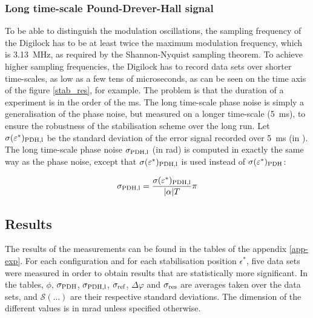 
\subsubsection{Long time-scale Pound-Drever-Hall signal}

To be able to distinguish the modulation oscillations, the sampling frequency of the Digilock has to be at least twice the maximum \pdh modulation frequency, which is \SI{3.13}{\mega\hertz}, as required by the Shannon-Nyquist sampling theorem. To achieve higher sampling frequencies, the Digilock has to record data sets over shorter time-scales, as low as a few tens of microseconds, as can be seen on the time axis of the figure \ref{stab_res}, for example. The problem is that the duration of a \rcer experiment is in the order of the \si{\milli\second}. The long time-scale \pdh phase noise is simply a generalisation of the \pdh phase noise, but measured on a longer time-scale (\SI{5}{\milli\second}), to ensure the robustness of the stabilisation scheme over the long run. Let $\sigma(\varepsilon^*)_{\text{PDH,l}}$ be the standard deviation of the \pdh error signal recorded over \SI{5}{\milli\second} (in \si{\au}). The long time-scale \pdh phase noise $\sigma_{\text{PDH,l}}$ (in \si{\radian}) is computed in exactly the same way as the \pdh phase noise, except that $\sigma(\varepsilon^*)_{\text{PDH,l}}$ is used instead of $\sigma(\varepsilon^*)_{\text{PDH}}$:

\begin{equation}
	\sigma_{\text{PDH,l}} = \frac{\sigma(\varepsilon^*)_{\text{PDH,l}}}{|\alpha|T}\pi
\end{equation}


\subsection{Results}

The results of the measurements can be found in the tables of the appendix \ref{app-exp}. For each \pdh configuration and for each \pdh stabilisation position $\epsilon^*$, five data sets were measured in order to obtain results that are statistically more significant. In the tables, $\phi$, $\sigma_{\text{PDH}}$, $\sigma_{\text{PDH,l}}$, $\sigma_{\text{ref}}$, $\Delta \varphi$ and $\sigma_{\text{res}}$ are averages taken over the data sets, and $\mathcal{S}(\dots)$ are their respective standard deviations. The dimension of the different values is in \si{\milli\radian} unless specified otherwise.\\

